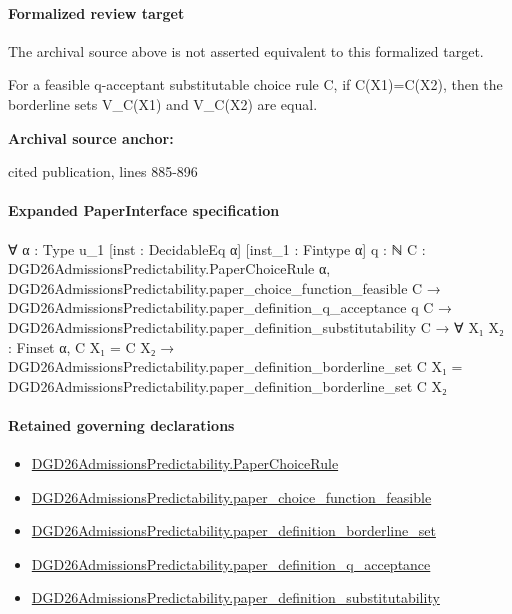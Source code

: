 \documentclass[10pt]{article}
\begin{document}
\paragraph{Formalized review target}
The archival source above is not asserted equivalent to this formalized target.
\begin{ReviewVerbatim}
For a feasible q-acceptant substitutable choice rule C, if C(X1)=C(X2), then the borderline sets V_C(X1) and V_C(X2) are equal.
\end{ReviewVerbatim}

\textbf{Archival source anchor:} {\footnotesize\raggedright cited publication, lines 885-\allowbreak{}896\par}
\paragraph{Expanded PaperInterface specification}
\begin{ReviewVerbatim}
∀ {α : Type u_1} [inst : DecidableEq α] [inst_1 : Fintype α] {q : ℕ}
  {C : DGD26AdmissionsPredictability.PaperChoiceRule α},
  DGD26AdmissionsPredictability.paper_choice_function_feasible C →
    DGD26AdmissionsPredictability.paper_definition_q_acceptance q C →
      DGD26AdmissionsPredictability.paper_definition_substitutability C →
        ∀ {X₁ X₂ : Finset α},
          C X₁ = C X₂ →
            DGD26AdmissionsPredictability.paper_definition_borderline_set C X₁ =
              DGD26AdmissionsPredictability.paper_definition_borderline_set C X₂
\end{ReviewVerbatim}

\paragraph{Retained governing declarations}
\begin{itemize}\raggedright
\item \hyperlink{governing-declaration-4678951b4432b184}{DGD26\allowbreak{}Admissions\allowbreak{}Predictability.\allowbreak{}Paper\allowbreak{}Choice\allowbreak{}Rule}
\item \hyperlink{governing-declaration-f7de74a44053f6d5}{DGD26\allowbreak{}Admissions\allowbreak{}Predictability.\allowbreak{}paper\_\allowbreak{}choice\_\allowbreak{}function\_\allowbreak{}feasible}
\item \hyperlink{governing-declaration-6c36470804ab6581}{DGD26\allowbreak{}Admissions\allowbreak{}Predictability.\allowbreak{}paper\_\allowbreak{}definition\_\allowbreak{}borderline\_\allowbreak{}set}
\item \hyperlink{governing-declaration-7ecd62274fb2f391}{DGD26\allowbreak{}Admissions\allowbreak{}Predictability.\allowbreak{}paper\_\allowbreak{}definition\_\allowbreak{}q\_\allowbreak{}acceptance}
\item \hyperlink{governing-declaration-39cdd64a379d386b}{DGD26\allowbreak{}Admissions\allowbreak{}Predictability.\allowbreak{}paper\_\allowbreak{}definition\_\allowbreak{}substitutability}
\end{itemize}
\end{document}
